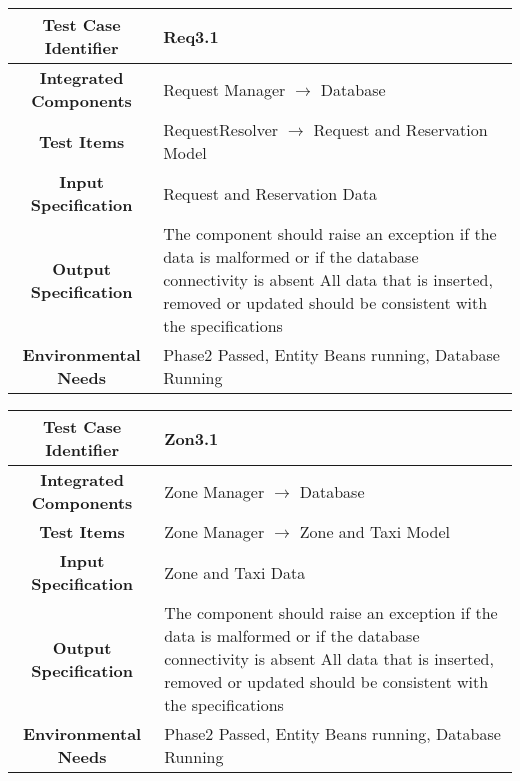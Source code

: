 \documentclass[11pt, a4paper,titlepage]{article}
\begin{document}
		\begin{tabularx}{\textwidth}{| c|X|}
			\hline \textbf{Test Case Identifier} & Req3.1 \\
			\hline \textbf{Integrated Components} & Request Manager $\rightarrow $ Database \\
			\hline \textbf{Test Items} & RequestResolver $\rightarrow $ Request and Reservation Model \\
			\hline \textbf{Input Specification} & Request and Reservation Data \\
			\hline \textbf{Output Specification} & The component should raise an exception if the data is malformed or if the database connectivity is absent \newline
			All data that is inserted, removed or updated should be consistent with the specifications\\
			\hline \textbf{Environmental Needs} & Phase2 Passed, Entity Beans running, Database Running \\
			\hline
		\end{tabularx}
		\newline
		
		\begin{tabularx}{\textwidth}{| c|X|}
			\hline \textbf{Test Case Identifier} & Zon3.1 \\
			\hline \textbf{Integrated Components} & Zone Manager $\rightarrow $ Database \\
			\hline \textbf{Test Items} &  Zone Manager $\rightarrow $ Zone and Taxi Model \\
			\hline \textbf{Input Specification} & Zone and Taxi Data \\
			\hline \textbf{Output Specification} & The component should raise an exception if the data is malformed or if the database connectivity is absent \newline
			All data that is inserted, removed or updated should be consistent with the specifications\\
			\hline \textbf{Environmental Needs} & Phase2 Passed, Entity Beans running, Database Running \\
			\hline
		\end{tabularx}
		\newline
\end{document}
